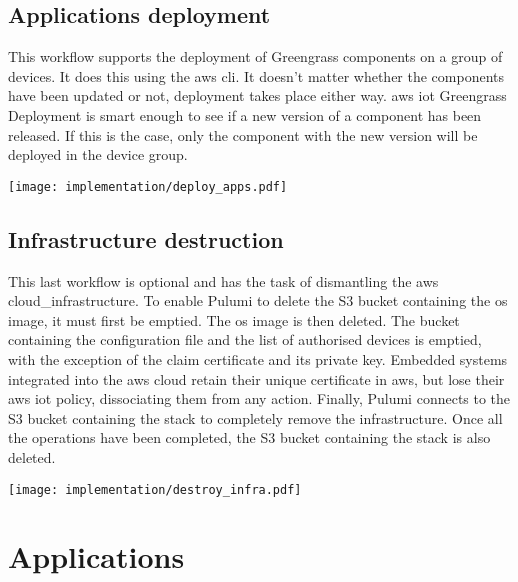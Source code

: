 \subsection{Applications deployment}
This workflow supports the deployment of Greengrass components on a group of devices. It does this using the \gls{aws} \acrshort{cli}. It doesn't matter whether the components have been updated or not, deployment takes place either way. \gls{aws} \acrshort{iot} Greengrass Deployment is smart enough to see if a new version of a component has been released. If this is the case, only the component with the new version will be deployed in the device group.
\begin{center}
    \begingroup
    \texttt{[image: implementation/deploy\_apps.pdf]}
    \label{fig:deploy_apps}
    \endgroup
\end{center}

\subsection{Infrastructure destruction}
This last workflow is optional and has the task of dismantling the \gls{aws} \gls{cloud_infrastructure}. To enable Pulumi to delete the S3 bucket containing the \acrshort{os} image, it must first be emptied. The \acrshort{os} image is then deleted. The bucket containing the configuration file and the list of authorised devices is emptied, with the exception of the claim certificate and its private key. Embedded systems integrated into the \gls{aws} \gls{cloud} retain their unique certificate in \gls{aws}, but lose their \gls{aws} \acrshort{iot} policy, dissociating them from any action. Finally, Pulumi connects to the S3 bucket containing the stack to completely remove the infrastructure. Once all the operations have been completed, the S3 bucket containing the stack is also deleted.
\begin{center}
    \begingroup
    \texttt{[image: implementation/destroy\_infra.pdf]}
    \label{fig:destroy_infra}
    \endgroup
\end{center}

\section{Applications}

